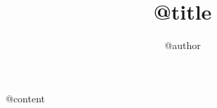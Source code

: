 \documentclass{report}
\title{@{title}}
\author{@{author}}
\begin{document}
    \maketitle
    @{content}
\end{document}
